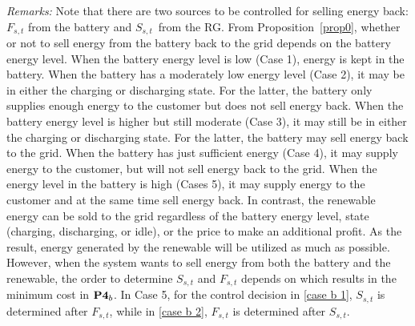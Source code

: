 \documentclass[journal]{IEEEtran}
\begin{document}
\emph{Remarks:} Note that there are two sources to be controlled for  selling energy back: $F_{s,t}$ from the battery and $S_{s,t}$\ from the RG. From Proposition~\ref{prop0}, whether or not to sell energy from the battery back to the grid depends on the battery energy level.  When the battery energy level is low (Case 1), energy is kept in the battery. When the battery has a moderately low energy level (Case 2), it may be  in either the charging or discharging state. For the latter,  the battery only supplies enough energy to the customer but does not sell energy back. When the battery  energy level is higher but still moderate (Case 3),  it may still be  in either the charging or discharging state. For the latter, the battery may sell energy back to the grid. When the battery has just sufficient energy (Case 4), it may supply energy  to the customer, but will not sell energy back to the grid.  When the energy level in the battery is high (Cases 5), it may  supply energy to the customer and at the same time sell energy back. In contrast,  the renewable energy can be sold to the grid regardless of the battery energy level,  state (charging, discharging, or idle), or the price  to make an additional profit. As the result, energy generated by the renewable will be utilized as much as possible. However, when  the system  wants to sell energy from both the battery and the renewable, the order to determine $S_{s,t}$ and $F_{s,t}$ depends on which results in the minimum cost in $\text{\bf P4}_b$. In Case 5, for the control decision in \eqref{case b 1},   $S_{s,t}$ is determined after $F_{s,t}$, while in \eqref{case b 2},  $F_{s,t}$ is determined after $S_{s,t}$.
\end{document}
